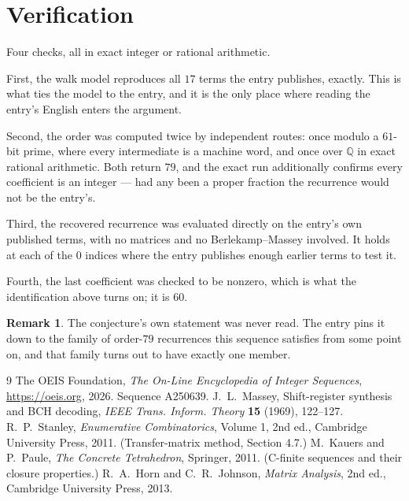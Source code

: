 \documentclass[11pt,a4paper]{article}
\theoremstyle{plain}
\theoremstyle{definition}
\newtheorem{remark}[theorem]{Remark}
\begin{document}
\section{Verification}

Four checks, all in exact integer or rational arithmetic.

First, the walk model reproduces all $17$ terms the entry publishes, exactly. This is
what ties the model to the entry, and it is the only place where reading the entry's English
enters the argument.

Second, the order was computed twice by independent routes: once modulo a $61$-bit prime, where
every intermediate is a machine word, and once over $\mathbb{Q}$ in exact rational arithmetic.
Both return $79$, and the exact run additionally confirms every coefficient is an integer
--- had any been a proper fraction the recurrence would not be the entry's.

Third, the recovered recurrence was evaluated directly on the entry's own published terms, with
no matrices and no Berlekamp--Massey involved. It holds at each of the $0$ indices where
the entry publishes enough earlier terms to test it.

Fourth, the last coefficient was checked to be nonzero, which is what the identification above
turns on; it is $60$.

\begin{remark}
The conjecture's own statement was never read. The entry pins it down to the family of
order-$79$ recurrences this sequence satisfies from some point on, and that family turns
out to have exactly one member.
\end{remark}

\begin{thebibliography}{9}
 The OEIS Foundation, \emph{The On-Line Encyclopedia of Integer
Sequences}, \url{https://oeis.org}, 2026. Sequence A250639.
 J.~L.~Massey, Shift-register synthesis and BCH decoding, \emph{IEEE
Trans. Inform. Theory} \textbf{15} (1969), 122--127.
 R.~P.~Stanley, \emph{Enumerative Combinatorics}, Volume 1, 2nd ed.,
Cambridge University Press, 2011. (Transfer-matrix method, Section 4.7.)
 M.~Kauers and P.~Paule, \emph{The Concrete Tetrahedron}, Springer, 2011.
(C-finite sequences and their closure properties.)
 R.~A.~Horn and C.~R.~Johnson, \emph{Matrix Analysis}, 2nd ed., Cambridge
University Press, 2013.
\end{thebibliography}
\end{document}
